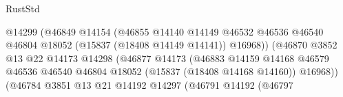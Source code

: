 \begin{lexlean}{RustStd}
\begin{coremodule}
                                                      @14299
                                                      (@46849
                                                        @14154
                                                        (@46855
                                                          @14140
                                                          @14149
                                                          @46532
                                                          @46536
                                                          @46540
                                                          @46804
                                                          @18052
                                                          (@15837 (@18408 @14149 @14141))
                                                          @16968))
                                                      (@46870
                                                        @3852
                                                        @13
                                                        @22
                                                        @14173
                                                        @14298
                                                        (@46877
                                                          @14173
                                                          (@46883
                                                            @14159
                                                            @14168
                                                            @46579
                                                            @46536
                                                            @46540
                                                            @46804
                                                            @18052
                                                            (@15837 (@18408 @14168 @14160))
                                                            @16968))
                                                        (@46784
                                                          @3851
                                                          @13
                                                          @21
                                                          @14192
                                                          @14297
                                                          (@46791
                                                            @14192
                                                            (@46797

\end{coremodule}
\end{lexlean}
